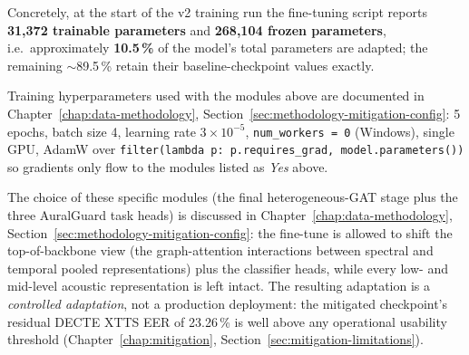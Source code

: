Concretely, at the start of the v2 training run the fine-tuning
script reports \textbf{31,372 trainable parameters} and
\textbf{268,104 frozen parameters}, i.e.\ approximately \textbf{10.5\,\%}
of the model's total parameters are adapted; the remaining
$\sim$89.5\,\% retain their baseline-checkpoint values exactly.

Training hyperparameters used with the modules above are documented
in Chapter~\ref{chap:data-methodology}, Section~\ref{sec:methodology-mitigation-config}:
5 epochs, batch size 4, learning rate $3 \times 10^{-5}$,
\texttt{num\_workers = 0} (Windows), single GPU, AdamW over
\texttt{filter(lambda p: p.requires\_grad, model.parameters())} so
gradients only flow to the modules listed as \textit{Yes} above.

The choice of these specific modules (the final heterogeneous-GAT
stage plus the three AuralGuard task heads) is discussed in
Chapter~\ref{chap:data-methodology}, Section~\ref{sec:methodology-mitigation-config}:
the fine-tune is allowed to shift the top-of-backbone view (the
graph-attention interactions between spectral and temporal pooled
representations) plus the classifier heads, while every low- and
mid-level acoustic representation is left intact. The resulting
adaptation is a \emph{controlled adaptation}, not a production
deployment: the mitigated checkpoint's residual DECTE XTTS EER of
23.26\,\% is well above any operational usability threshold
(Chapter~\ref{chap:mitigation}, Section~\ref{sec:mitigation-limitations}).
